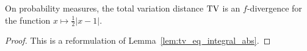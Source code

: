 
\begin{lemma}
  \label{lem:tv_eq_fDiv}
  \leanok
  On probability measures, the total variation distance $\operatorname{TV}$ is an $f$-divergence for the function $x \mapsto \frac{1}{2}\vert x - 1 \vert$.
\end{lemma}

\begin{proof}\leanok
{}
This is a reformulation of Lemma~\ref{lem:tv_eq_integral_abs}.
\end{proof}